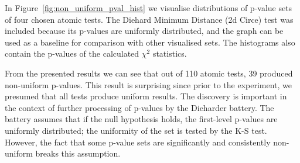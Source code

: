 \documentclass[
  digital,  	%
  color,		%
  oneside,   	%
  12pt,
  nocover,
  notable,
  nolof,
  nolot,
]{fithesis3}
\theoremstyle{definition}
\theoremstyle{remark}
\begin{document}
In Figure~\ref{fig:non_uniform_pval_hist} we visualise distributions of p-value sets of four chosen atomic tests. The Diehard Minimum Distance (2d Circe) test was included because its p-values are uniformly distributed, and the graph can be used as a baseline for comparison with other visualised sets. The histograms also contain the p-values of the calculated $\chi^2$ statistics.

From the presented results we can see that out of 110 atomic tests, 39 produced non-uniform p-values. This result is surprising since prior to the experiment, we presumed that all tests produce uniform results. The discovery is important in the context of further processing of p-values by the Dieharder battery. The battery assumes that if the null hypothesis holds, the first-level p-values are uniformly distributed; the uniformity of the set is tested by the K-S test. However, the fact that some p-value sets are significantly and consistently non-uniform breaks this assumption.
\end{document}
